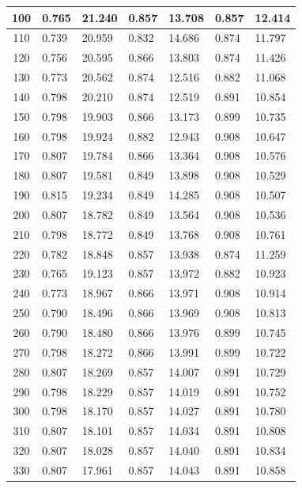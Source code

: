\begin{longtable}{|c|l|l|l|l|l|l|}
        100 & 0.765 & 21.240 & 0.857 & 13.708 & 0.857 & 12.414 \\ \hline
        110 & 0.739 & 20.959 & 0.832 & 14.686 & 0.874 & 11.797 \\ \hline
        120 & 0.756 & 20.595 & 0.866 & 13.803 & 0.874 & 11.426 \\ \hline
        130 & 0.773 & 20.562 & 0.874 & 12.516 & 0.882 & 11.068 \\ \hline
        140 & 0.798 & 20.210 & 0.874 & 12.519 & 0.891 & 10.854 \\ \hline
        150 & 0.798 & 19.903 & 0.866 & 13.173 & 0.899 & 10.735 \\ \hline
        160 & 0.798 & 19.924 & 0.882 & 12.943 & 0.908 & 10.647 \\ \hline
        170 & 0.807 & 19.784 & 0.866 & 13.364 & 0.908 & 10.576 \\ \hline
        180 & 0.807 & 19.581 & 0.849 & 13.898 & 0.908 & 10.529 \\ \hline
        190 & 0.815 & 19.234 & 0.849 & 14.285 & 0.908 & 10.507 \\ \hline
        200 & 0.807 & 18.782 & 0.849 & 13.564 & 0.908 & 10.536 \\ \hline
        210 & 0.798 & 18.772 & 0.849 & 13.768 & 0.908 & 10.761 \\ \hline
        220 & 0.782 & 18.848 & 0.857 & 13.938 & 0.874 & 11.259 \\ \hline
        230 & 0.765 & 19.123 & 0.857 & 13.972 & 0.882 & 10.923 \\ \hline
        240 & 0.773 & 18.967 & 0.866 & 13.971 & 0.908 & 10.914 \\ \hline
        250 & 0.790 & 18.496 & 0.866 & 13.969 & 0.908 & 10.813 \\ \hline
        260 & 0.790 & 18.480 & 0.866 & 13.976 & 0.899 & 10.745 \\ \hline
        270 & 0.798 & 18.272 & 0.866 & 13.991 & 0.899 & 10.722 \\ \hline
        280 & 0.807 & 18.269 & 0.857 & 14.007 & 0.891 & 10.729 \\ \hline
        290 & 0.798 & 18.229 & 0.857 & 14.019 & 0.891 & 10.752 \\ \hline
        300 & 0.798 & 18.170 & 0.857 & 14.027 & 0.891 & 10.780 \\ \hline
        310 & 0.807 & 18.101 & 0.857 & 14.034 & 0.891 & 10.808 \\ \hline
        320 & 0.807 & 18.028 & 0.857 & 14.040 & 0.891 & 10.834 \\ \hline
        330 & 0.807 & 17.961 & 0.857 & 14.043 & 0.891 & 10.858 \\ \hline

\end{longtable}
